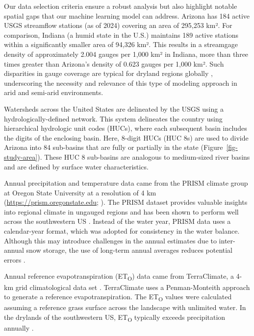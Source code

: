 \documentclass[
  authoryear,
  preprint,
  1p,
  onecolumn]{elsarticle}
\begin{document}
Our data selection criteria ensure a robust analysis but also highlight
notable spatial gaps that our machine learning model can address.
Arizona has 184 active USGS streamflow stations (as of 2024) covering an
area of 295,253 km². For comparison, Indiana (a humid state in the U.S.)
maintains 189 active stations within a significantly smaller area of
94,326 km². This results in a streamgage density of approximately 2.004
gauges per 1,000 km² in Indiana, more than three times greater than
Arizona's density of 0.623 gauges per 1,000 km². Such disparities in
gauge coverage are typical for dryland regions globally
\citep{krabbenhoft-2022}, underscoring the necessity and relevance of
this type of modeling approach in arid and semi-arid environments.

Watersheds across the United States are delineated by the USGS using a
hydrologically-defined network. This system delineates the country using
hierarchical hydrologic unit codes (HUCs), where each subsequent basin
includes the digits of the enclosing basin. Here, 8-digit HUCs (HUC 8s)
are used to divide Arizona into 84 sub-basins that are fully or
partially in the state (Figure~\ref{fig-study-area}). These HUC 8
sub-basins are analogous to medium-sized river basins and are defined by
surface water characteristics.

Annual precipitation and temperature data came from the PRISM climate
group at Oregon State University at a resolution of 4 km
(\url{https://prism.oregonstate.edu;} \citep{daly2008}). The PRISM
dataset provides valuable insights into regional climate in ungauged
regions and has been shown to perform well across the southwestern US
\citep{buban_PRISM}. Instead of the water year, PRISM data uses a
calendar-year format, which was adopted for consistency in the water
balance. Although this may introduce challenges in the annual estimates
due to inter-annual snow storage, the use of long-term annual averages
reduces potential errors \citep{reitz2017}.

Annual reference evapotranspiration (ET\textsubscript{O}) data came from
TerraClimate, a 4-km grid climatological data set
\citep{abatzoglou2018}. TerraClimate uses a Penman-Monteith approach to
generate a reference evapotranspiration. The ET\textsubscript{O} values
were calculated assuming a reference grass surface across the landscape
with unlimited water. In the drylands of the southwestern US,
ET\textsubscript{O} typically exceeds precipitation annually
\citep{zomer2022}.
\end{document}
